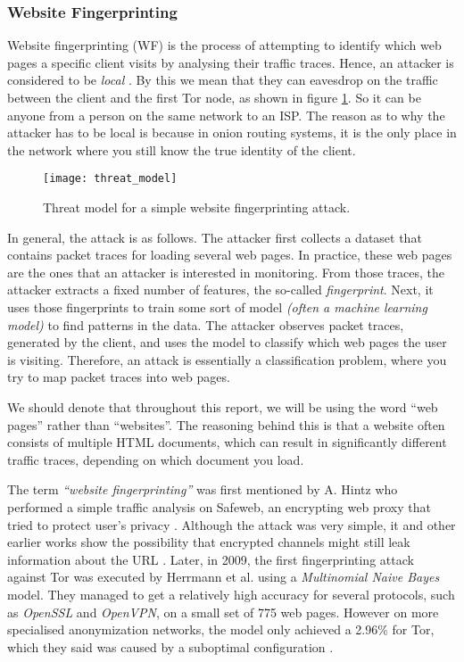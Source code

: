 \subsubsection{Website Fingerprinting}

Website fingerprinting (WF) is the process of attempting to identify which web pages a specific client visits by analysing their traffic traces.
Hence, an attacker is considered to be \textit{local} . By this we mean that they can eavesdrop on the traffic between the client and the first Tor node, as shown in figure \ref{fig:threat_model}.
So it can be anyone from a person on the same network to an ISP.
The reason as to why the attacker has to be local is because in onion routing systems, it is the only place in the network where you still know
the true identity of the client.

\begin{figure}[h]
  \centering
  \texttt{[image: threat\_model]}
  \caption{Threat model for a simple website fingerprinting attack.}
  \label{fig:threat_model}
\end{figure}

In general, the attack is as follows. The attacker first collects a dataset that contains packet traces for loading several web pages.
In practice, these web pages are the ones that an attacker is interested in monitoring.
From those traces, the attacker extracts a fixed number of features, the so-called \textit{fingerprint}.
Next, it uses those fingerprints to train some sort of model \textit{(often a machine learning model)} to find patterns in the data.
The attacker observes packet traces, generated by the client, and uses the model to classify which web pages the user is visiting.
Therefore, an attack is essentially a classification problem, where you try to map packet traces into web pages.

We should denote that throughout this report, we will be using the word ``web pages'' rather than ``websites''.
The reasoning behind this is that a website often consists of multiple HTML documents,
which can result in significantly different traffic traces, depending on which document you load.

The term \textit{``website fingerprinting''} was first mentioned by A. Hintz who performed a simple traffic analysis on Safeweb,
an encrypting web proxy that tried to protect user's privacy \cite{hintz2002fingerprinting}. Although the attack was very simple, it and other earlier
works show the possibility that encrypted channels might still leak information about the URL \cite{hintz2002fingerprinting, wagner1996analysis}.
Later, in 2009, the first fingerprinting attack against Tor was executed by Herrmann et al. using a \textit{Multinomial Naive Bayes} model.
They managed to get a relatively high accuracy for several protocols, such as \textit{OpenSSL} and \textit{OpenVPN}, on a small set of 775 web pages.
However on more specialised anonymization networks, the model only achieved a 2.96\% for Tor, which they said was caused by a suboptimal configuration \cite{herrmann2009website}.

